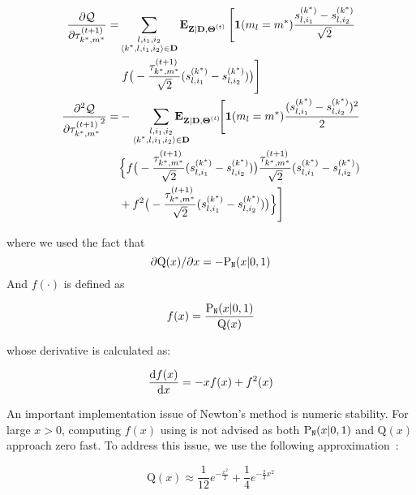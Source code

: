 \begin{align}
\frac{\partial \mathcal{Q}}{\partial \tau_{k^*,m^*}^{(t+1)}} =
& \sum\limits_{\substack{l, i_1, i_2 \\ \langle k^*, l,i_1,i_2 \rangle
      \in \mathbf{D}}}
  \E_{\mathbf{Z|D,\Theta}^{(t)}}
  \left[ \mathbf{1}(m_l=m^*) \frac{s_{l,i_1}^{(k^*)} -
    s_{l,i_2}^{(k^*)}}{\sqrt{2}} \right. \nonumber \\
&  \left. f\big(-\frac{\tau_{k^*,m^*}^{(t+1)}}{\sqrt{2}}(s_{l,i_1}^{(k^*)} -
    s_{l,i_2}^{(k^*)})\big) \right] \label{eq::tau1}\\
\frac{\partial^2 \mathcal{Q}}{\partial {\tau_{k^*,m^*}^{(t+1)}}^2} =
& -\sum\limits_{\substack{l, i_1, i_2 \\ \langle k^*, l,i_1,i_2 \rangle
    \in \mathbf{D}}}
    \hspace{-15pt}\E_{\mathbf{Z|D,\Theta}^{(t)}}
    \hspace{-2pt}\Bigg[\mathbf{1}(m_l=m^*)
      \frac{(s_{l,i_1}^{(k^*)} - s_{l,i_2}^{(k^*)})^2}{2}  \nonumber \\
& \Big\{ f\big(-\frac{\tau_{k^*,m^*}^{(t+1)}}{\sqrt{2}}(s_{l,i_1}^{(k^*)}
              - s_{l,i_2}^{(k^*)})\big)
        \frac{\tau_{k^*,m^*}^{(t+1)}}{\sqrt{2}}
        (s_{l,i_1}^{(k^*)} - s_{l,i_2}^{(k^*)}) \nonumber \\
&  + f^2 \big(-\frac{\tau_{k^*,m^*}^{(t+1)}}{\sqrt{2}}
        (s_{l,i_1}^{(k^*)} - s_{l,i_2}^{(k^*)})\big)
  \Big\} \Bigg] \label{eq::tau2}
\end{align}

where we used the fact that
$$\partial \mathrm{Q}(x) / \partial x = - \P_\mathtt{N}(x | 0, 1)$$
And $f(\cdot)$ is defined as

\begin{equation}
f(x)=\frac{\P_\mathtt{N}(x | 0,1)}{\mathrm{Q}(x)} \label{eq::f_def}
\end{equation}

whose derivative is calculated as:

\begin{equation}
\frac{\d f(x)}{\d x}  = -x f(x) + f^2(x)
\end{equation}

An important implementation issue of Newton's method is numeric stability.
For large $x > 0$, computing $f(x)$ using  is not advised as
both $\P_\mathtt{N}(x | 0, 1)$ and $\mathrm{Q}(x)$ approach zero fast. To
address this issue, we use the following approximation~\cite{chiani2003new}:

\begin{equation}
\mathrm{Q}(x) \approx
  \frac{1}{12}e^{-\frac{x^2}{2}} + \frac{1}{4}e^{-\frac{2}{3}x^2}
\end{equation}

